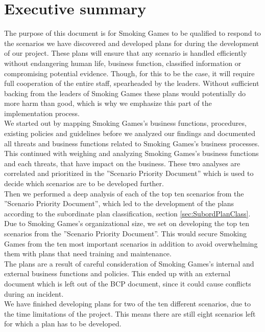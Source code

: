 \chapter{Executive summary}

The purpose of this document is for Smoking Games to be qualified to respond to the scenarios we have discovered and developed plans for during the development of our project. These plans will ensure that any scenario is handled efficiently without endangering human life, business function, classified information or compromising potential evidence. Though, for this to be the case, it will require full cooperation of the entire staff, spearheaded by the leaders. Without sufficient backing from the leaders of Smoking Games these plans would potentially do more harm than good, which is why we emphasize this part of the implementation process.\\
We started out by mapping Smoking Games's business functions, procedures, existing policies and guidelines before we analyzed our findings and documented all threats and business functions related to Smoking Games's business processes. This continued with weighing and analyzing Smoking Games's business functions and each threats, that have impact on the business. These two analyses are correlated and prioritized in the ”Scenario Priority Document” which is used to decide which scenarios are to be developed further.\\
Then we performed a deep analysis of each of the top ten scenarios from the ”Scenario Priority Document”, which led to the development of the plans according to the subordinate plan classification, section \ref{sec:SubordPlanClass}.\\
Due to Smoking Games's organizational size, we set on developing the top ten scenarios from the ”Scenario Priority Document”. This would secure Smoking Games from the ten most important scenarios in addition to avoid overwhelming them with plans that need training and maintenance.\\
The plans are a result of careful consideration of Smoking Games's internal and external business functions and policies. This ended up with an external document which is left out of the BCP document, since it could cause conflicts during an incident.\\
We have finished developing plans for two of the ten different scenarios, due to the time limitations of the project. This means there are still eight scenarios left for which a plan has to be developed.\\
